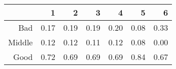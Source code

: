 \begin{table}[ht]
\centering
\begin{tabular}{rrrrrrr}
  \hline
 & 1 & 2 & 3 & 4 & 5 & 6 \\ 
  \hline
Bad & 0.17 & 0.19 & 0.19 & 0.20 & 0.08 & 0.33 \\ 
  Middle & 0.12 & 0.12 & 0.11 & 0.12 & 0.08 & 0.00 \\ 
  Good & 0.72 & 0.69 & 0.69 & 0.69 & 0.84 & 0.67 \\ 
   \hline
\end{tabular}
\end{table}
